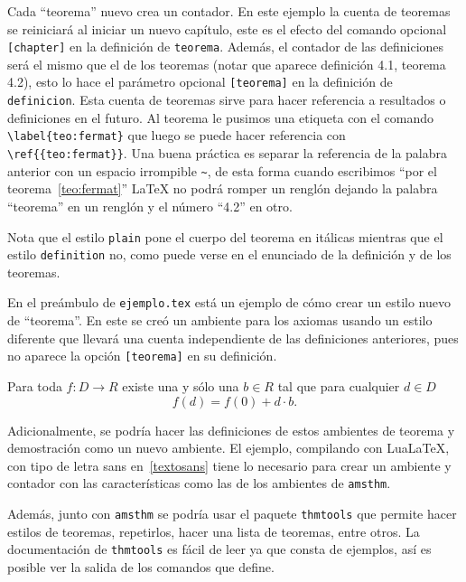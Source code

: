 Cada \enquote{teorema} nuevo crea un contador. En este ejemplo la cuenta de
teoremas se reiniciará al iniciar un nuevo capítulo, este es el efecto del
comando opcional \texttt{[chapter]} en la definición de \texttt{teorema}.
Además, el contador de las definiciones será el mismo que el de los teoremas
(notar que aparece definición 4.1, teorema 4.2), esto lo hace el parámetro
opcional \texttt{[teorema]} en la definición de \texttt{definicion}. Esta
cuenta de teoremas sirve para hacer referencia a resultados o definiciones
en el futuro. Al teorema le pusimos una etiqueta con el comando
\verb|\label{teo:fermat}| que luego se puede hacer referencia con
\verb|\ref{{teo:fermat}}|. Una buena práctica es separar la referencia de la
palabra anterior con un espacio irrompible \verb|~|, de esta forma cuando
escribimos \enquote{por el teorema~\ref{teo:fermat}} \LaTeX{} no podrá romper un
renglón dejando la palabra \enquote{teorema} en un renglón y el número \enquote{4.2} en
otro.

Nota que el estilo \texttt{plain} pone el cuerpo del teorema en itálicas
mientras que el estilo \texttt{definition} no, como puede verse en el
enunciado de la definición y de los teoremas.

En el preámbulo de \texttt{ejemplo.tex} está un ejemplo de cómo crear un
estilo nuevo de \enquote{teorema}. En este se creó un ambiente para los axiomas
usando un estilo diferente que llevará una cuenta independiente de las
definiciones anteriores, pues no aparece la opción \texttt{[teorema]} en su
definición.

\begin{axioma}
  Para toda \(f\colon D\to R\) existe una y sólo una \(b\in R\) tal que para
  cualquier \(d\in D\)
  \[
    f(d)=f(0)+d\cdot b.
  \]
\end{axioma}

Adicionalmente, se podría hacer las definiciones de estos ambientes de
teorema y demostración como un nuevo ambiente. El ejemplo, compilando con
Lua\LaTeX, con tipo de letra sans en~\ref{textosans} tiene lo necesario para
crear un ambiente y contador con las características como las de los
ambientes de \texttt{amsthm}.

Además, junto con \texttt{amsthm} se podría usar el paquete
\texttt{thmtools} que permite hacer estilos de teoremas, repetirlos, hacer
una lista de teoremas, entre otros. La documentación de \texttt{thmtools} es
fácil de leer ya que consta de ejemplos, así es posible ver la salida de los
comandos que define.

